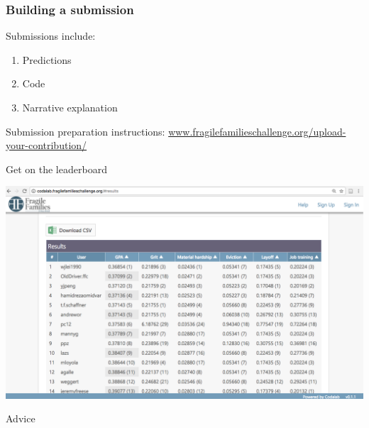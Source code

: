 \documentclass{beamer}
\begin{document}
\begin{frame}
\frametitle{Building a submission}

Submissions include:
\begin{enumerate}
\item Predictions
\item Code
\item Narrative explanation
\end{enumerate}

\vfill
Submission preparation instructions: \textcolor{blue}{\href{http://www.fragilefamilieschallenge.org/upload-your-contribution/}{www.fragilefamilieschallenge.org/upload-your-contribution/}}

\end{frame}
\begin{frame}{Get on the leaderboard}

\includegraphics[width = \textwidth]{figures/leaderboard}

\end{frame}
\begin{frame}

\begin{center}
\LARGE{Advice}
\end{center}

\end{frame}
\end{document}
